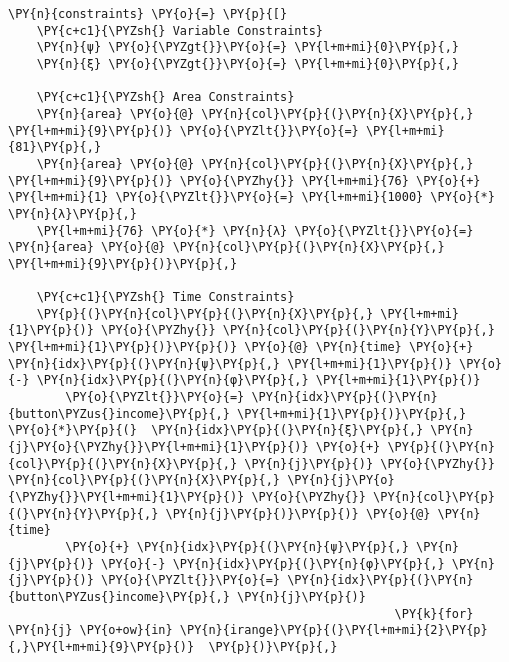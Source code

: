 \begin{tcolorbox}[breakable, size=fbox, boxrule=1pt, pad at break*=1mm,colback=cellbackground, colframe=cellborder]
    \begin{Verbatim}[commandchars=\\\{\}]
\PY{n}{constraints} \PY{o}{=} \PY{p}{[}
    \PY{c+c1}{\PYZsh{} Variable Constraints}
    \PY{n}{ψ} \PY{o}{\PYZgt{}}\PY{o}{=} \PY{l+m+mi}{0}\PY{p}{,}
    \PY{n}{ξ} \PY{o}{\PYZgt{}}\PY{o}{=} \PY{l+m+mi}{0}\PY{p}{,}

    \PY{c+c1}{\PYZsh{} Area Constraints}
    \PY{n}{area} \PY{o}{@} \PY{n}{col}\PY{p}{(}\PY{n}{X}\PY{p}{,} \PY{l+m+mi}{9}\PY{p}{)} \PY{o}{\PYZlt{}}\PY{o}{=} \PY{l+m+mi}{81}\PY{p}{,}
    \PY{n}{area} \PY{o}{@} \PY{n}{col}\PY{p}{(}\PY{n}{X}\PY{p}{,} \PY{l+m+mi}{9}\PY{p}{)} \PY{o}{\PYZhy{}} \PY{l+m+mi}{76} \PY{o}{+} \PY{l+m+mi}{1} \PY{o}{\PYZlt{}}\PY{o}{=} \PY{l+m+mi}{1000} \PY{o}{*} \PY{n}{λ}\PY{p}{,}
    \PY{l+m+mi}{76} \PY{o}{*} \PY{n}{λ} \PY{o}{\PYZlt{}}\PY{o}{=} \PY{n}{area} \PY{o}{@} \PY{n}{col}\PY{p}{(}\PY{n}{X}\PY{p}{,} \PY{l+m+mi}{9}\PY{p}{)}\PY{p}{,}

    \PY{c+c1}{\PYZsh{} Time Constraints}
    \PY{p}{(}\PY{n}{col}\PY{p}{(}\PY{n}{X}\PY{p}{,} \PY{l+m+mi}{1}\PY{p}{)} \PY{o}{\PYZhy{}} \PY{n}{col}\PY{p}{(}\PY{n}{Y}\PY{p}{,} \PY{l+m+mi}{1}\PY{p}{)}\PY{p}{)} \PY{o}{@} \PY{n}{time} \PY{o}{+} \PY{n}{idx}\PY{p}{(}\PY{n}{ψ}\PY{p}{,} \PY{l+m+mi}{1}\PY{p}{)} \PY{o}{-} \PY{n}{idx}\PY{p}{(}\PY{n}{φ}\PY{p}{,} \PY{l+m+mi}{1}\PY{p}{)}
        \PY{o}{\PYZlt{}}\PY{o}{=} \PY{n}{idx}\PY{p}{(}\PY{n}{button\PYZus{}income}\PY{p}{,} \PY{l+m+mi}{1}\PY{p}{)}\PY{p}{,}
\PY{o}{*}\PY{p}{(}  \PY{n}{idx}\PY{p}{(}\PY{n}{ξ}\PY{p}{,} \PY{n}{j}\PY{o}{\PYZhy{}}\PY{l+m+mi}{1}\PY{p}{)} \PY{o}{+} \PY{p}{(}\PY{n}{col}\PY{p}{(}\PY{n}{X}\PY{p}{,} \PY{n}{j}\PY{p}{)} \PY{o}{\PYZhy{}} \PY{n}{col}\PY{p}{(}\PY{n}{X}\PY{p}{,} \PY{n}{j}\PY{o}{\PYZhy{}}\PY{l+m+mi}{1}\PY{p}{)} \PY{o}{\PYZhy{}} \PY{n}{col}\PY{p}{(}\PY{n}{Y}\PY{p}{,} \PY{n}{j}\PY{p}{)}\PY{p}{)} \PY{o}{@} \PY{n}{time}
        \PY{o}{+} \PY{n}{idx}\PY{p}{(}\PY{n}{ψ}\PY{p}{,} \PY{n}{j}\PY{p}{)} \PY{o}{-} \PY{n}{idx}\PY{p}{(}\PY{n}{φ}\PY{p}{,} \PY{n}{j}\PY{p}{)} \PY{o}{\PYZlt{}}\PY{o}{=} \PY{n}{idx}\PY{p}{(}\PY{n}{button\PYZus{}income}\PY{p}{,} \PY{n}{j}\PY{p}{)}
                                                      \PY{k}{for} \PY{n}{j} \PY{o+ow}{in} \PY{n}{irange}\PY{p}{(}\PY{l+m+mi}{2}\PY{p}{,}\PY{l+m+mi}{9}\PY{p}{)}  \PY{p}{)}\PY{p}{,}


\end{Verbatim}
\end{tcolorbox}
